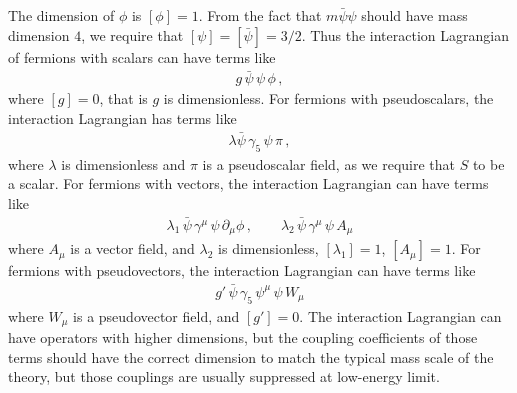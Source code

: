 \documentclass[11pt, onesided]{book}
\theoremstyle{break}
\theoremstyle{break}
\newcommand{\pd}{\partial}
\begin{document}
The dimension of $\phi$ is $[\phi] = 1$. From the fact that $m\bar{\psi}\psi$ should have mass dimension $4$, we require that $[\psi] = [\bar{\psi}] = 3/2$. Thus the interaction Lagrangian of fermions with scalars can have terms like
\begin{align*}
g\, \bar{\psi}\, \psi \,\phi\,,
\end{align*}
where $[g] = 0$, that is $g$ is dimensionless. For fermions with pseudoscalars, the interaction Lagrangian has terms like
\begin{align*}
\lambda \bar{\psi} \,\gamma_5\, \psi \, \pi\,,
\end{align*}
where $\lambda$ is dimensionless and $\pi$ is a pseudoscalar field, as we require that $S$ to be a scalar. For fermions with vectors, the interaction Lagrangian can have terms like
\begin{align*}
\lambda_1\,\bar{\psi}\, \gamma^\mu \, \psi \, \pd_\mu \phi\,,\qquad
\lambda_2\,\bar{\psi}\,\gamma^\mu\, \psi\, A_\mu
\end{align*}
where $A_\mu$ is a vector field, and $\lambda_2$ is dimensionless, $[\lambda_1] = 1$, $[A_\mu] = 1$. For fermions with pseudovectors, the interaction Lagrangian can have terms like
\begin{align*}
g'\, \bar{\psi}\, \gamma_5 \, \psi^\mu \,\psi\, W_\mu
\end{align*}
where $W_\mu$ is a pseudovector field, and $[g'] = 0$. The interaction Lagrangian can have operators with higher dimensions, but the coupling coefficients of those terms should have the correct dimension to match the typical mass scale of the theory, but those couplings are usually suppressed at low-energy limit. \\
\end{document}
